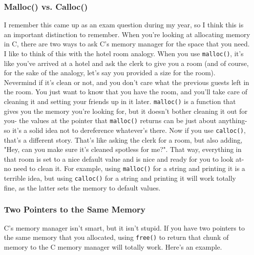 \documentclass[english, 10pt]{article}
\begin{document}
\subsubsection{Malloc() vs. Calloc()}

I remember this came up as an exam question during my year, so I think this is an important distinction to remember. When you're looking at allocating memory in C, there are two ways to ask C's memory manager for the space that you need. I like to think of this with the hotel room analogy. When you use \texttt{malloc()}, it's like you've arrived at a hotel and ask the clerk to give you a room (and of course, for the sake of the analogy, let's say you provided a size for the room). Nevermind if it's clean or not, and you don't care what the previous guests left in the room. You just want to know that you have the room, and you'll take care of cleaning it and setting your friends up in it later. \texttt{malloc()} is a function that gives you the memory you're looking for, but it doesn't bother cleaning it out for you- the values at the pointer that \texttt{malloc()} returns can be just about anything- so it's a solid idea not to dereference whatever's there. Now if you use \texttt{calloc()}, that's a different story. That's like asking the clerk for a room, but also adding, "Hey, can you make sure it's cleaned spotless for me?". That way, everything in that room is set to a nice default value and is nice and ready for you to look at- no need to clean it. For example, using \texttt{malloc()} for a string and printing it is a terrible idea, but using \texttt{calloc()} for a string and printing it will work totally fine, as the latter sets the memory to default values.

\subsubsection{Two Pointers to the Same Memory}

C's memory manager isn't smart, but it isn't stupid. If you have two pointers to the same memory that you allocated, using \texttt{free()} to return that chunk of memory to the C memory manager will totally work. Here's an example.\newline
\end{document}
